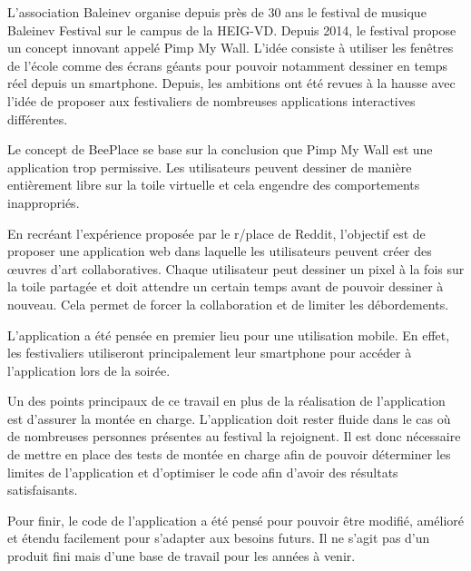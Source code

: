 L'association Baleinev organise depuis près de 30 ans le festival de musique Baleinev Festival sur le campus de la HEIG-VD. Depuis 2014, le festival propose un concept innovant appelé Pimp My Wall. L'idée consiste à utiliser les fenêtres de l'école comme des écrans géants pour pouvoir notamment dessiner en temps réel depuis un smartphone. Depuis, les ambitions ont été revues à la hausse avec l'idée de proposer aux festivaliers de nombreuses applications interactives différentes.

Le concept de BeePlace se base sur la conclusion que Pimp My Wall est une application trop permissive. Les utilisateurs peuvent dessiner de manière entièrement libre sur la toile virtuelle et cela engendre des comportements inappropriés.

En recréant l'expérience proposée par le r/place de Reddit, l'objectif est de proposer une application web dans laquelle les utilisateurs peuvent créer des œuvres d'art collaboratives. Chaque utilisateur peut dessiner un pixel à la fois sur la toile partagée et doit attendre un certain temps avant de pouvoir dessiner à nouveau. Cela permet de forcer la collaboration et de limiter les débordements.

L'application a été pensée en premier lieu pour une utilisation mobile. En effet, les festivaliers utiliseront principalement leur smartphone pour accéder à l'application lors de la soirée.

Un des points principaux de ce travail en plus de la réalisation de l'application est d'assurer la montée en charge. L'application doit rester fluide dans le cas où de nombreuses personnes présentes au festival la rejoignent. Il est donc nécessaire de mettre en place des tests de montée en charge afin de pouvoir déterminer les limites de l'application et d'optimiser le code afin d'avoir des résultats satisfaisants.

Pour finir, le code de l'application a été pensé pour pouvoir être modifié, amélioré et étendu facilement pour s'adapter aux besoins futurs. Il ne s'agit pas d'un produit fini mais d'une base de travail pour les années à venir.
